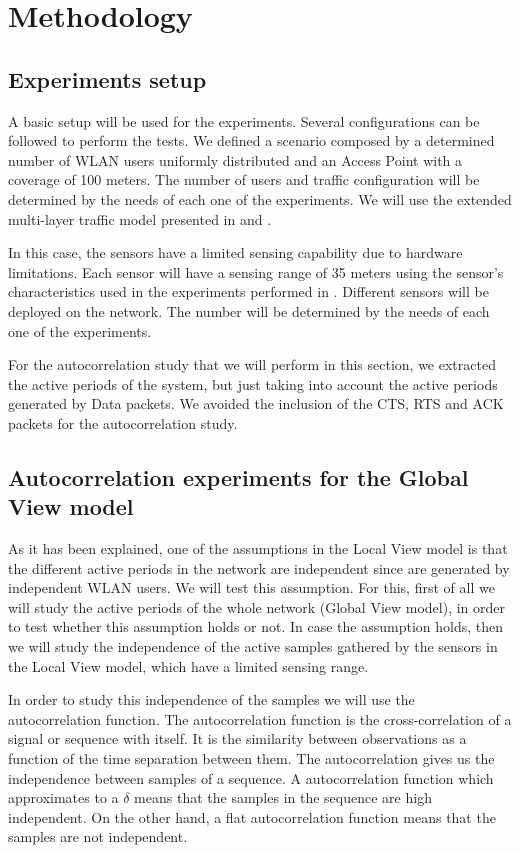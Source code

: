\section{Methodology} \label{sec:autocorrelation_methodology}

\subsection{Experiments setup} \label{sec:experiment_setup}
A basic setup will be used for the experiments. Several configurations can be followed to perform the tests. We defined a scenario composed by a determined number of \acs{WLAN} users uniformly distributed and an Access Point with a coverage of 100 meters. The number of users and traffic configuration will be determined by the needs of each one of the experiments. We will use the extended multi-layer traffic model presented in \cite{Campus-WLAN} and \cite{marcello}.

In this case, the sensors have a limited sensing capability due to hardware limitations. Each sensor will have a sensing range of 35 meters using the sensor's characteristics used in the experiments performed in \cite{marcello}. Different sensors will be deployed on the network. The number will be determined by the needs of each one of the experiments.

For the autocorrelation study that we will perform in this section, we extracted the active periods of the system, but just taking into account the active periods generated by Data packets. We avoided the inclusion of the \acs{CTS}, \acs{RTS} and \acs{ACK} packets for the autocorrelation study.

\subsection{Autocorrelation experiments for the Global View model} \label{subsec:autocorrelation_active}
As it has been explained, one of the assumptions in the Local View model is that the different active periods in the network are independent since are generated by independent \acs{WLAN} users. We will test this assumption. For this, first of all we will study the active periods of the whole network (Global View model), in order to test whether this assumption holds or not. In case the assumption holds, then we will study the independence of the active samples gathered by the sensors in the Local View model, which have a limited sensing range.

In order to study this independence of the samples we will use the autocorrelation function. The autocorrelation function is the cross-correlation of a signal or sequence with itself. It is the similarity between observations as a function of the time separation between them. The autocorrelation gives us the independence between samples of a sequence. A autocorrelation function which approximates to a $\delta$ means that the samples in the sequence are high independent. On the other hand, a flat autocorrelation function means that the samples are not independent.

